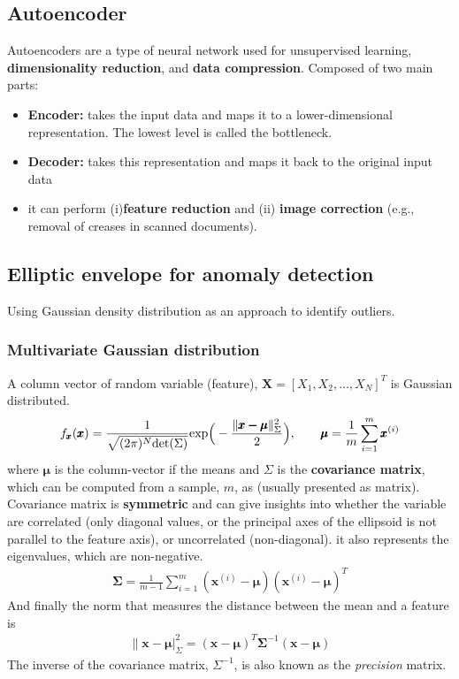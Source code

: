 \documentclass[a4paper,10pt]{article}
\begin{document}
\subsection{Autoencoder}
Autoencoders are a type of neural network used for unsupervised learning, \textbf{dimensionality reduction}, and \textbf{data compression}. Composed of two main parts:
\begin{itemize}
    \item \textbf{Encoder:} takes the input data and maps it to a lower-dimensional representation. The lowest level is called the bottleneck. 
    \item \textbf{Decoder:} takes this representation and maps it back to the original input data
    \item it can perform (i)\textbf{feature reduction} and (ii) \textbf{image correction} (e.g., removal of creases in scanned documents).
\end{itemize}

\subsection{Elliptic envelope for anomaly detection}
Using Gaussian density distribution as an approach to identify outliers. 
\subsubsection{Multivariate Gaussian distribution}
A column vector of random variable (feature), $\pmb{X} = [X_1, X_2, \dots, X_N]^T$ is Gaussian distributed. 
\begin{gather*}
    f_{\pmb{x}}(\pmb{x}) = \frac{1}{\sqrt{(2\pi)^N\text{det}(\Sigma)}}\text{exp}\Big(-\frac{\lVert\pmb{x-\mu}\rVert^2_\Sigma}{2}\Big),
    \hspace*{0.7cm}
    \pmb{\mu}=\frac{1}{m}\sum_{i=1}^{m}\pmb{x}^{(i)}
\end{gather*}
where $\pmb{\mu}$ is the column-vector if the means and $\Sigma$ is the \textbf{covariance matrix}, which can be computed from a sample, $m$, as (usually presented as matrix). Covariance matrix is \textbf{symmetric} and can give insights into whether the variable are correlated (only diagonal values, or the principal axes of the ellipsoid is not parallel to the feature axis), or uncorrelated (non-diagonal). it also represents the eigenvalues, which are non-negative.
\begin{gather*}
    \pmb{\Sigma} = \frac{1}{m-1}\sum_{i=1}^{m}(\pmb{x}^{(i)}-\pmb{\mu})(\pmb{x}^{(i)}-\pmb{\mu})^T
\end{gather*}
And finally the norm that measures the distance between the mean and a feature is
\begin{gather*}
    \lVert\pmb{x}-\pmb{\mu}\rvert^2_\Sigma = (\pmb{x}-\pmb{\mu})^T\pmb{\Sigma}^{-1}(\pmb{x}-\pmb{\mu})
\end{gather*}
The inverse of the covariance matrix, $\Sigma^{-1}$, is also known as the \textit{precision} matrix. 
\end{document}
